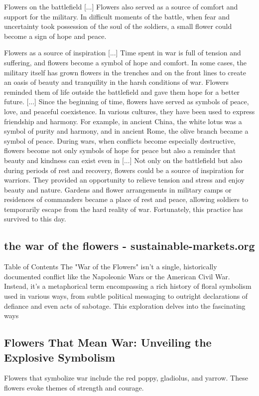 \documentclass[12pt]{article}
\begin{document}
Flowers on the battlefield [...] Flowers also served as a source of comfort and support for the military. In difficult moments of the battle, when fear and uncertainty took possession of the soul of the soldiers, a small flower could become a sign of hope and peace.

Flowers as a source of inspiration [...] Time spent in war is full of tension and suffering, and flowers become a symbol of hope and comfort. In some cases, the military itself has grown flowers in the trenches and on the front lines to create an oasis of beauty and tranquility in the harsh conditions of war. Flowers reminded them of life outside the battlefield and gave them hope for a better future. [...] Since the beginning of time, flowers have served as symbols of peace, love, and peaceful coexistence. In various cultures, they have been used to express friendship and harmony. For example, in ancient China, the white lotus was a symbol of purity and harmony, and in ancient Rome, the olive branch became a symbol of peace. During wars, when conflicts become especially destructive, flowers become not only symbols of hope for peace but also a reminder that beauty and kindness can exist even in [...] Not only on the battlefield but also during periods of rest and recovery, flowers could be a source of inspiration for warriors. They provided an opportunity to relieve tension and stress and enjoy beauty and nature. Gardens and flower arrangements in military camps or residences of commanders became a place of rest and peace, allowing soldiers to temporarily escape from the hard reality of war. Fortunately, this practice has survived to this day.\subsection{the war of the flowers - sustainable-markets.org}
Table of Contents The "War of the Flowers" isn't a single, historically documented conflict like the Napoleonic Wars or the American Civil War. Instead, it's a metaphorical term encompassing a rich history of floral symbolism used in various ways, from subtle political messaging to outright declarations of defiance and even acts of sabotage. This exploration delves into the fascinating ways\subsection{Flowers That Mean War: Unveiling the Explosive Symbolism}
Flowers that symbolize war include the red poppy, gladiolus, and yarrow. These flowers evoke themes of strength and courage.
\end{document}
